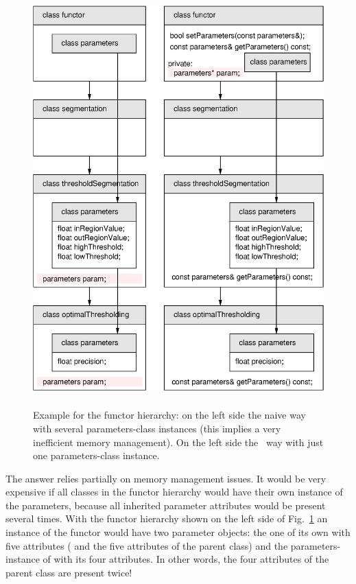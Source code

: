 \begin{figure}[htbp]
  \begin{center}
    \includegraphics[height=16cm]{fig/paramhier}
    \caption{Example for the functor hierarchy: on the left side the naive way
      with several parameters-class instances (this implies a very inefficient
      memory management).  On the left side the \ltilib\ way with just one
      parameters-class instance.}
    \label{fig:paramhier}
  \end{center} 
\end{figure}

The answer relies partially on memory management issues.  It would be very
expensive if all classes in the functor hierarchy would have their own instance
of the parameters, because all inherited parameter attributes would be present
several times.  With the functor hierarchy shown on the left side of
Fig.~\ref{fig:paramhier}  an instance of the functor
 would have two parameter objects: the one of
its own with five attributes ( and the five attributes of the
parent class) and the parameters-instance of 
with its four attributes.  In other words, the four attributes of the parent
class are present twice!

